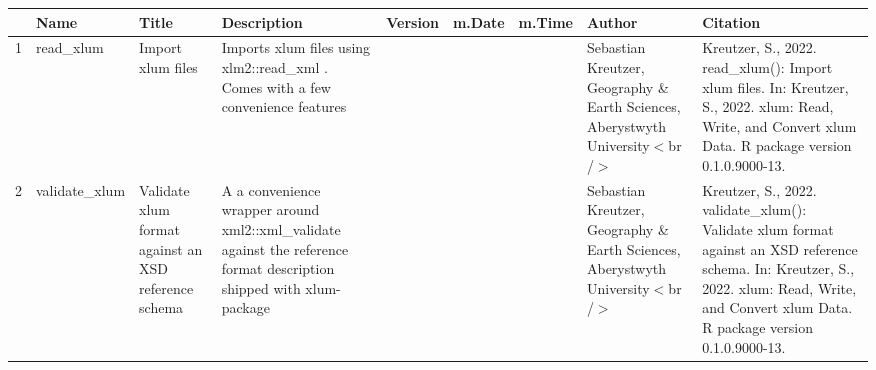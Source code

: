 \begin{table}[ht]
\centering
\begin{tabular}{rllllllll}
  \hline
 & Name & Title & Description & Version & m.Date & m.Time & Author & Citation \\ 
  \hline
1 & read\_xlum & Import xlum files & Imports xlum files using  xlm2::read\_xml . Comes with a few convenience features &  &  &  & Sebastian Kreutzer, Geography \& Earth Sciences, Aberystwyth University$<$br /$>$ & Kreutzer, S., 2022. read\_xlum(): Import xlum files. In: Kreutzer, S., 2022. xlum: Read, Write, and Convert xlum Data. R package version 0.1.0.9000-13. 
 \\ 
  2 & validate\_xlum & Validate xlum format against an XSD reference schema & A a convenience wrapper around  xml2::xml\_validate  against the reference format description shipped with  xlum-package &  &  &  & Sebastian Kreutzer, Geography \& Earth Sciences, Aberystwyth University$<$br /$>$ & Kreutzer, S., 2022. validate\_xlum(): Validate xlum format against an XSD reference schema. In: Kreutzer, S., 2022. xlum: Read, Write, and Convert xlum Data. R package version 0.1.0.9000-13. 
 \\ 
   \hline
\end{tabular}
\end{table}

